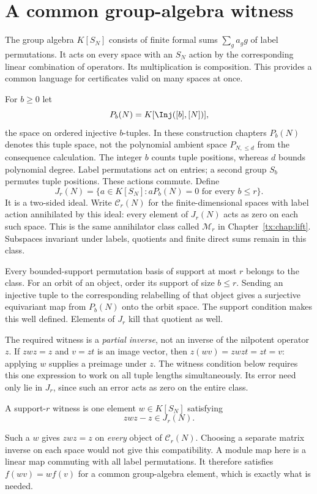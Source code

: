 \section{A common group-algebra witness}\label{tx:sec:common}
The group algebra $K[S_N]$ consists of finite formal sums $\sum_ga_gg$ of label permutations. It acts on every space with an $S_N$ action by the corresponding linear combination of operators. Its multiplication is composition. This provides a common language for certificates valid on many spaces at once.

For $b\ge0$ let
\[P_b(N)=K[\Inj([b],[N])],\]
the space on ordered injective $b$-tuples. In these construction chapters $P_b(N)$ denotes this tuple space, not the polynomial ambient space $P_{N,\le d}$ from the consequence calculation. The integer $b$ counts tuple positions, whereas $d$ bounds polynomial degree. Label permutations act on entries; a second group $S_b$ permutes tuple positions. These actions commute. Define
\[J_r(N)=\{a\in K[S_N]:aP_b(N)=0\text{ for every }b\le r\}.\]
It is a two-sided ideal. Write $\mathcal C_r(N)$ for the finite-dimensional spaces with label action annihilated by this ideal: every element of $J_r(N)$ acts as zero on each such space. This is the same annihilator class called $\mathcal M_r$ in Chapter~\ref{tx:chap:lift}. Subspaces invariant under labels, quotients and finite direct sums remain in this class.

Every bounded-support permutation basis of support at most $r$ belongs to the class. For an orbit of an object, order its support of size $b\le r$. Sending an injective tuple to the corresponding relabelling of that object gives a surjective equivariant map from $P_b(N)$ onto the orbit space. The support condition makes this well defined. Elements of $J_r$ kill that quotient as well.

The required witness is a \emph{partial inverse}, not an inverse of
the nilpotent operator $z$. If $zwz=z$ and $v=zt$ is an image
vector, then $z(wv)=zwzt=zt=v$: applying $w$ supplies a preimage
under $z$. The witness condition below requires this one expression
to work on all tuple lengths simultaneously. Its error need only
lie in $J_r$, since such an error acts as zero on the entire class.

\begin{definition}
A support-$r$ witness is one element $w\in K[S_N]$ satisfying
\begin{equation}\label{tx:eq:witness2}zwz-z\in J_r(N).
\end{equation}
\end{definition}
Such a $w$ gives $zwz=z$ on \emph{every} object of $\mathcal C_r(N)$. Choosing a separate matrix inverse on each space would not give this compatibility. A module map here is a linear map commuting with all label permutations. It therefore satisfies $f(wv)=w f(v)$ for a common group-algebra element, which is exactly what is needed.


